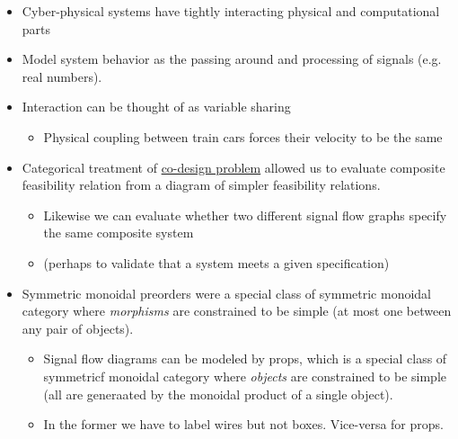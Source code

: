 \begin{itemize}
    \item Cyber-physical systems have tightly interacting physical and computational parts
    \item Model system behavior as the passing around and processing of signals (e.g. real numbers).
    \item Interaction can be thought of as variable sharing
          \begin{itemize}
            \item Physical coupling between train cars forces their velocity to be the same
          \end{itemize}
    \item Categorical treatment of \href{doc/1 math/Seven Sketches in Compositionality/Chapter 4: Co-design}{co-design problem} allowed us to evaluate composite feasibility relation from a diagram of simpler feasibility relations.
          \begin{itemize}
            \item Likewise we can evaluate whether two different signal flow graphs specify the same composite system
            \item (perhaps to validate that a system meets a given specification)
          \end{itemize}
    \item Symmetric monoidal preorders were a special class of symmetric monoidal category where \emph{morphisms} are constrained to be simple (at most one between any pair of objects).
          \begin{itemize}
            \item Signal flow diagrams can be modeled by props, which is a special class of symmetricf monoidal category where \emph{objects} are constrained to be simple (all are generaated by the monoidal product of a single object).
            \item In the former we have to label wires but not boxes. Vice-versa for props.
          \end{itemize}
  \end{itemize}
